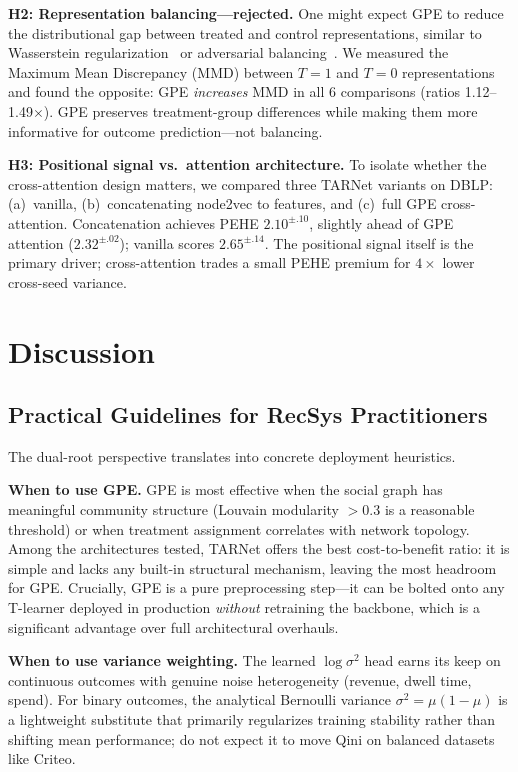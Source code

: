 \documentclass[sigconf,anonymous,review]{acmart}
\begin{document}
\textbf{H2: Representation balancing---rejected.} One might expect GPE to reduce the distributional gap between treated and control representations, similar to Wasserstein regularization~\cite{guo2020learning} or adversarial balancing~\cite{chu2021graph}. We measured the Maximum Mean Discrepancy (MMD) between $T{=}1$ and $T{=}0$ representations and found the opposite: GPE \emph{increases} MMD in all 6 comparisons (ratios 1.12--1.49$\times$). GPE preserves treatment-group differences while making them more informative for outcome prediction---not balancing.

\textbf{H3: Positional signal vs.\ attention architecture.} To isolate whether the cross-attention design matters, we compared three TARNet variants on DBLP: (a)~vanilla, (b)~concatenating node2vec to features, and (c)~full GPE cross-attention. Concatenation achieves PEHE $2.10^{\pm.10}$, slightly ahead of GPE attention ($2.32^{\pm.02}$); vanilla scores $2.65^{\pm.14}$. The positional signal itself is the primary driver; cross-attention trades a small PEHE premium for $4{\times}$ lower cross-seed variance.

\section{Discussion}\label{sec:discuss}

\subsection{Practical Guidelines for RecSys Practitioners}

The dual-root perspective translates into concrete deployment heuristics.

\textbf{When to use GPE.} GPE is most effective when the social graph has meaningful community structure (Louvain modularity $> 0.3$ is a reasonable threshold) or when treatment assignment correlates with network topology. Among the architectures tested, TARNet offers the best cost-to-benefit ratio: it is simple and lacks any built-in structural mechanism, leaving the most headroom for GPE. Crucially, GPE is a pure preprocessing step---it can be bolted onto any T-learner deployed in production \emph{without} retraining the backbone, which is a significant advantage over full architectural overhauls.

\textbf{When to use variance weighting.} The learned $\log\sigma^2$ head earns its keep on continuous outcomes with genuine noise heterogeneity (revenue, dwell time, spend). For binary outcomes, the analytical Bernoulli variance $\sigma^2 = \mu(1-\mu)$ is a lightweight substitute that primarily regularizes training stability rather than shifting mean performance; do not expect it to move Qini on balanced datasets like Criteo.
\end{document}
